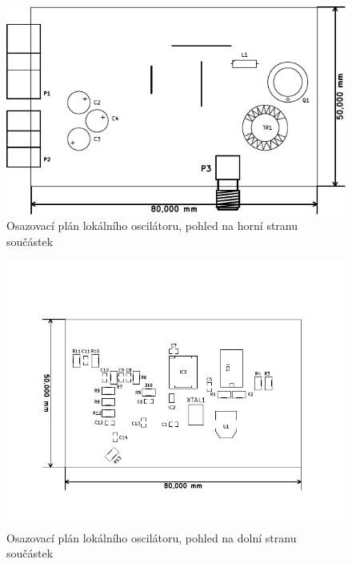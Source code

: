 \begin{figure}[H]
	\centering
	\includegraphics[width=170mm]{img/lo/os_f.pdf}
	\caption{Osazovací plán lokálního oscilátoru, pohled na horní stranu součástek}    		
\end{figure}

\begin{figure}[H]
	\centering
	\includegraphics[width=170mm]{img/lo/os_b.pdf}
	\caption{Osazovací plán lokálního oscilátoru, pohled na dolní stranu součástek}    		
\end{figure}


